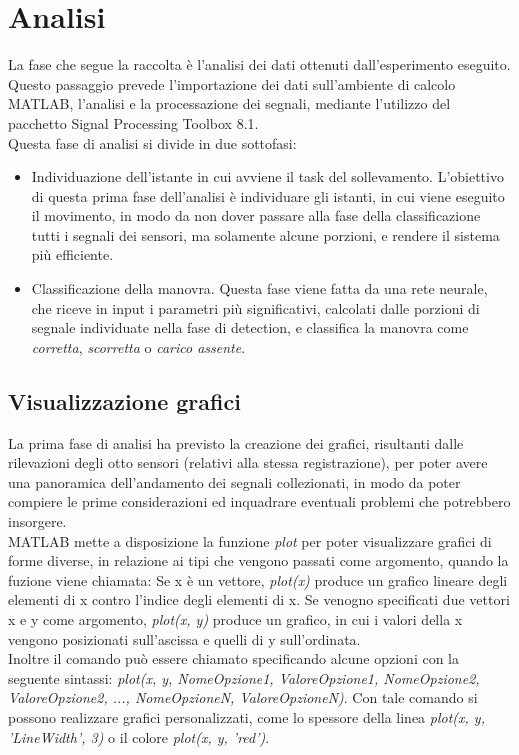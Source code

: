 \documentclass[a4paper, oneside]{book}
\begin{document}
\clearpage


\chapter{Analisi}
La fase che segue la raccolta è l'analisi dei dati ottenuti dall'esperimento eseguito. Questo passaggio prevede l'importazione dei dati sull'ambiente di calcolo MATLAB, l'analisi e la processazione dei segnali, mediante l'utilizzo  del pacchetto Signal Processing Toolbox 8.1. \\
Questa fase di analisi si divide in due sottofasi:
\begin {itemize}
\item Individuazione dell'istante in cui avviene il task del sollevamento. L'obiettivo di questa prima fase dell'analisi è individuare gli istanti, in cui viene eseguito il movimento, in modo da non dover passare alla fase della classificazione tutti i segnali dei sensori, ma solamente alcune porzioni, e rendere il sistema più efficiente.
\item Classificazione della manovra. Questa fase viene fatta da una rete neurale, che riceve in input i parametri più significativi, calcolati dalle porzioni di segnale individuate nella fase di detection, e classifica la manovra come \textit{corretta}, \textit{scorretta} o \textit{carico assente}.
\end{itemize}

\section{Visualizzazione grafici}
La prima fase di analisi ha previsto la creazione dei grafici, risultanti dalle rilevazioni degli otto sensori (relativi alla stessa registrazione), per poter avere una panoramica dell'andamento dei segnali collezionati, in modo da poter compiere le prime considerazioni ed inquadrare eventuali problemi che potrebbero insorgere.\\
MATLAB mette a disposizione la funzione \textit{plot} per poter visualizzare grafici di forme diverse, in relazione ai tipi che vengono passati come argomento, quando la fuzione viene chiamata:  Se x è un vettore, \textit{plot(x)} produce un grafico lineare degli elementi di x contro l’indice degli elementi di x. Se venogno specificati due vettori x e y come argomento,\textit{ plot(x, y) } produce un grafico, in cui i valori della x vengono posizionati sull'ascissa e quelli di y sull'ordinata. \\
Inoltre il comando può essere chiamato specificando alcune opzioni con la seguente sintassi: \textit{plot(x, y, NomeOpzione1, ValoreOpzione1, NomeOpzione2, ValoreOpzione2, ..., NomeOpzioneN, ValoreOpzioneN)}. Con tale comando si possono realizzare grafici personalizzati, come lo spessore della linea \textit{plot(x, y, 'LineWidth', 3)} o il colore \textit{plot(x, y, 'red')}.
\end{document}
